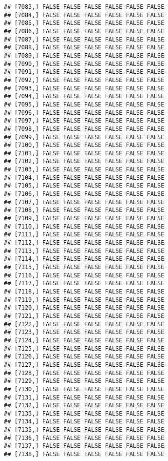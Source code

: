 \documentclass[
]{article}
\begin{document}
\begin{verbatim}
## [7083,] FALSE FALSE FALSE FALSE FALSE FALSE
## [7084,] FALSE FALSE FALSE FALSE FALSE FALSE
## [7085,] FALSE FALSE FALSE FALSE FALSE FALSE
## [7086,] FALSE FALSE FALSE FALSE FALSE FALSE
## [7087,] FALSE FALSE FALSE FALSE FALSE FALSE
## [7088,] FALSE FALSE FALSE FALSE FALSE FALSE
## [7089,] FALSE FALSE FALSE FALSE FALSE FALSE
## [7090,] FALSE FALSE FALSE FALSE FALSE FALSE
## [7091,] FALSE FALSE FALSE FALSE FALSE FALSE
## [7092,] FALSE FALSE FALSE FALSE FALSE FALSE
## [7093,] FALSE FALSE FALSE FALSE FALSE FALSE
## [7094,] FALSE FALSE FALSE FALSE FALSE FALSE
## [7095,] FALSE FALSE FALSE FALSE FALSE FALSE
## [7096,] FALSE FALSE FALSE FALSE FALSE FALSE
## [7097,] FALSE FALSE FALSE FALSE FALSE FALSE
## [7098,] FALSE FALSE FALSE FALSE FALSE FALSE
## [7099,] FALSE FALSE FALSE FALSE FALSE FALSE
## [7100,] FALSE FALSE FALSE FALSE FALSE FALSE
## [7101,] FALSE FALSE FALSE FALSE FALSE FALSE
## [7102,] FALSE FALSE FALSE FALSE FALSE FALSE
## [7103,] FALSE FALSE FALSE FALSE FALSE FALSE
## [7104,] FALSE FALSE FALSE FALSE FALSE FALSE
## [7105,] FALSE FALSE FALSE FALSE FALSE FALSE
## [7106,] FALSE FALSE FALSE FALSE FALSE FALSE
## [7107,] FALSE FALSE FALSE FALSE FALSE FALSE
## [7108,] FALSE FALSE FALSE FALSE FALSE FALSE
## [7109,] FALSE FALSE FALSE FALSE FALSE FALSE
## [7110,] FALSE FALSE FALSE FALSE FALSE FALSE
## [7111,] FALSE FALSE FALSE FALSE FALSE FALSE
## [7112,] FALSE FALSE FALSE FALSE FALSE FALSE
## [7113,] FALSE FALSE FALSE FALSE FALSE FALSE
## [7114,] FALSE FALSE FALSE FALSE FALSE FALSE
## [7115,] FALSE FALSE FALSE FALSE FALSE FALSE
## [7116,] FALSE FALSE FALSE FALSE FALSE FALSE
## [7117,] FALSE FALSE FALSE FALSE FALSE FALSE
## [7118,] FALSE FALSE FALSE FALSE FALSE FALSE
## [7119,] FALSE FALSE FALSE FALSE FALSE FALSE
## [7120,] FALSE FALSE FALSE FALSE FALSE FALSE
## [7121,] FALSE FALSE FALSE FALSE FALSE FALSE
## [7122,] FALSE FALSE FALSE FALSE FALSE FALSE
## [7123,] FALSE FALSE FALSE FALSE FALSE FALSE
## [7124,] FALSE FALSE FALSE FALSE FALSE FALSE
## [7125,] FALSE FALSE FALSE FALSE FALSE FALSE
## [7126,] FALSE FALSE FALSE FALSE FALSE FALSE
## [7127,] FALSE FALSE FALSE FALSE FALSE FALSE
## [7128,] FALSE FALSE FALSE FALSE FALSE FALSE
## [7129,] FALSE FALSE FALSE FALSE FALSE FALSE
## [7130,] FALSE FALSE FALSE FALSE FALSE FALSE
## [7131,] FALSE FALSE FALSE FALSE FALSE FALSE
## [7132,] FALSE FALSE FALSE FALSE FALSE FALSE
## [7133,] FALSE FALSE FALSE FALSE FALSE FALSE
## [7134,] FALSE FALSE FALSE FALSE FALSE FALSE
## [7135,] FALSE FALSE FALSE FALSE FALSE FALSE
## [7136,] FALSE FALSE FALSE FALSE FALSE FALSE
## [7137,] FALSE FALSE FALSE FALSE FALSE FALSE
## [7138,] FALSE FALSE FALSE FALSE FALSE FALSE

\end{verbatim}
\end{document}
